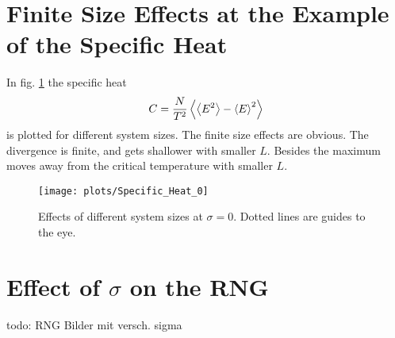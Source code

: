 \section{Finite Size Effects at the Example of the Specific Heat}
\label{appendix:finiteSizeEffects}
    In fig. \ref{fig:smeared_out_appendix} the specific heat
    \[C = \frac{N}{T^2}\left< \left< E^2 \right> - \left< E \right>^2 \right>\]
    is plotted for different system sizes. The finite size effects are obvious.
    The divergence is finite, and gets shallower with smaller \(L\). Besides
    the maximum moves away from the critical temperature with smaller \(L\).
    \begin{figure}[htbp]
        \centering
        \texttt{[image: plots/Specific\_Heat\_0]}
        \caption[Finite Size Effects by Example of the Specific Heat]
        {
            Effects of different system sizes at \(\sigma = 0\). Dotted lines
            are guides to the eye.
        }
        \label{fig:smeared_out_appendix}
    \end{figure}

\section{Effect of $\sigma$ on the RNG}
\label{appendix:RNGDisplacement}
    todo: RNG Bilder mit versch. sigma
